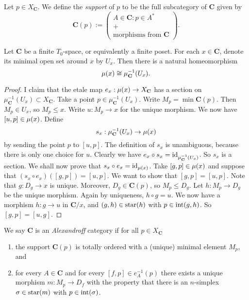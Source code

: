 \begin{definition*}
\label{def:support at a point}
Let $p \in X_\mathbf{C}$. We define the \emph{support} of $p$ to be the full subcategory of $\mathbf{C}$ given by
\[ \mathbf{C}(p) := \left(\begin{array}{c} A \in \mathbf{C} : p \in A^* \\ + \\ \text{morphisms from $\mathbf{C}$} \end{array} \right). \]
\end{definition*}

\begin{theorem*}
\label{thm:mccord functor generalizes the mccord map}
Let $\mathbf{C}$ be a finite $T_0$-space, or equivalently a finite poset. For each $x \in \mathbf{C}$, denote its minimal open set around $x$ by $U_x$. Then there is a natural homeomorphism
\[ \operatorname{\mu}(x) \cong \mu_\mathbf{C}^{-1}(U_x). \]
\end{theorem*}
\begin{proof}
I claim that the etale map $e_x : \operatorname{\mu}(x) \to X_\mathbf{C}$ has a section on $\mu_\mathbf{C}^{-1}(U_x) \subset X_\mathbf{C}$. Take a point $p \in \mu_\mathbf{C}^{-1}(U_x)$. Write $M_p = \min \mathbf{C}(p)$. 
Then $M_p \in U_x$, so $M_p \leq x$. Write $u : M_p \to x$ for the unique morphism. We now have $[u,p] \in \operatorname{\mu}(x)$. 
Define
\[ s_x : \mu_\mathbf{C}^{-1}(U_x) \to \operatorname{\mu}(x) \]
by sending the point $p$ to $[u,p]$. The definition of $s_x$ is unambiguous, because there is only one choice for $u$. Clearly we have $e_x \circ s_x = \operatorname{id}_{\mu_{\mathbf{C}}^{-1}\left(U_x \right)}$. So $s_x$ is a section. We shall now prove that $s_x \circ e_x = \operatorname{id}_{\operatorname{\mu}(x)}$. Take $[g,p] \in \operatorname{\mu}(x)$ and suppose that $(s_x \circ e_x)([g,p]) = [u,p]$. We want to show that $[g,p] = [u,p]$. Note that $g : D_g \to x$ is unique. Moreover, $D_g \in \mathbf{C}(p)$, so $M_p \leq D_g$. Let $h : M_p \to D_g$ be the unique morphism. Again by uniqueness, $h \circ g = u$. We now have a morphism $h : g \to u$ in $\mathbf{C}/x$, and $(g,h) \in \operatorname{star}(h)$ with $p \in \operatorname{int}(g,h)$. So $[g,p] = [u,g]$.
\end{proof}

\begin{definition*}
\label{def:alexandroff cat}
We say $\mathbf{C}$ is an \emph{Alexandroff} category if for all $p \in X_{\mathbf{C}}$
\begin{enumerate}
	\item the support $\mathbf{C}(p)$ is totally ordered with a (unique) minimal element $M_p$, and
	\item for every $A \in \mathbf{C}$ and for every $[f,p] \in e_A^{-1}(p)$ there exists a unique morphism $m : M_p \to D_f$ with the property that there is an $n$-simplex $\sigma \in \operatorname{star}(m)$ with $p \in \operatorname{int}(\sigma)$.
\end{enumerate}
\end{definition*}

